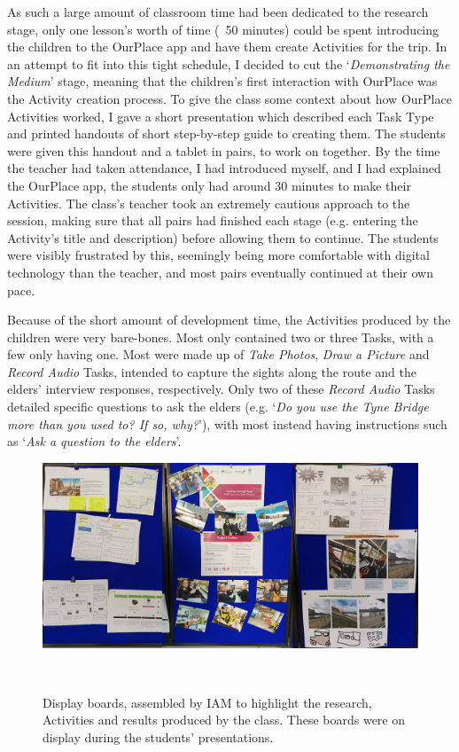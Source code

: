 As such a large amount of classroom time had been dedicated to the research stage, only one lesson's worth of time (~50 minutes) could be spent introducing the children to the OurPlace app and have them create Activities for the trip. In an attempt to fit into this tight schedule, I decided to cut the `\textit{Demonstrating the Medium}' stage, meaning that the children's first interaction with OurPlace was the Activity creation process. To give the class some context about how OurPlace Activities worked, I gave a short presentation which described each Task Type and printed handouts of short step-by-step guide to creating them. The students were given this handout and a tablet in pairs, to work on together. By the time the teacher had taken attendance, I had introduced myself, and I had explained the OurPlace app, the students only had around 30 minutes to make their Activities. The class's teacher took an extremely cautious approach to the session, making sure that all pairs had finished each stage (e.g. entering the Activity's title and description) before allowing them to continue. The students were visibly frustrated by this, seemingly being more comfortable with digital technology than the teacher, and most pairs eventually continued at their own pace. 

Because of the short amount of development time, the Activities produced by the children were very bare-bones. Most only contained two or three Tasks, with a few only having one. Most were made up of \textit{Take Photos}, \textit{Draw a Picture} and \textit{Record Audio} Tasks, intended to capture the sights along the route and the elders' interview responses, respectively. Only two of these \textit{Record Audio} Tasks detailed specific questions to ask the elders (e.g. `\textit{Do you use the Tyne Bridge more than you used to? If so, why?}'), with most instead having instructions such as `\textit{Ask a question to the elders}'.

\begin{figure}
\centering
  \includegraphics[width=1\columnwidth]{images/chapter08/displayBoards.jpg}
  \caption[Display boards showing students' work]{Display boards, assembled by IAM to highlight the research, Activities and results produced by the class. These boards were on display during the students' presentations.}~\label{fig:DisplayBoards}
\end{figure}

